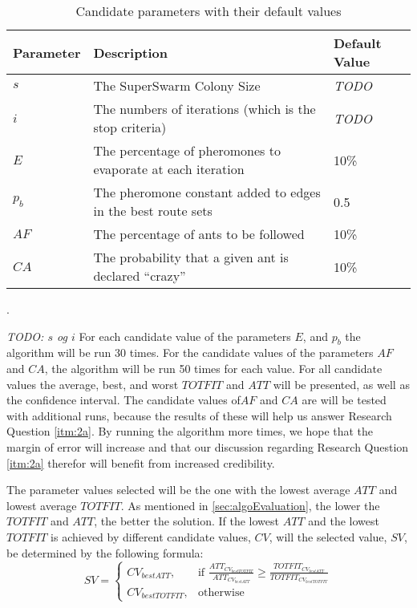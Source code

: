 \begin{table}[H]
	\small
	\begin{tabular}{|l|l|l|}
    	\hline
    	Parameter & Description & Default Value\\
    	\hline
    	$s$ & The SuperSwarm Colony Size & \emph{\color{blue}TODO}\\
    	$i$ & The numbers of iterations (which is the stop criteria) & \emph{\color{blue}TODO}\\
    	$E$ & The percentage of pheromones to evaporate at each iteration & 10\%\\
    	$p_b$ & The pheromone constant added to edges in the best route sets & 0.5\\
    	$AF$ & The percentage of ants to be followed & 10\%\\
    	$CA$ & The probability that a given ant is declared ``crazy'' & 10\%\\
   	    \hline
    \end{tabular}
    \caption {Candidate parameters with their default values}.
    \label{table:parameters}
\end{table}

\emph{\color{blue}TODO: $s$ og $i$}
For each candidate value of the parameters $E$, and $p_b$ the algorithm will be run 30 times. For the candidate values of the parameters $AF$ and $CA$, the algorithm will be run 50 times for each value. For all candidate values the average, best, and worst $TOTFIT$ and $ATT$ will be presented, as well as the confidence interval. The candidate values of$AF$ and $CA$ are will be tested with additional runs, because the results of these will help us answer Research Question \vref{itm:2a}. By running the algorithm more times, we hope that the margin of error will increase and that our discussion regarding Research Question \vref{itm:2a} therefor will benefit from increased credibility.

The parameter values selected will be the one with the lowest average $ATT$ and lowest average $TOTFIT$. As mentioned in \vref{sec:algoEvaluation}, the lower the $TOTFIT$ and $ATT$, the better the solution. If the lowest $ATT$ and the lowest$TOTFIT$ is achieved by different candidate values, $CV$, will the selected value, $SV$, be determined by the following formula:
\[
    SV= 
\begin{cases}
    CV_{bestATT},& \text{if } \frac{ATT_{CV_{bestTOTFIT}}}{ATT_{CV_{bestATT}}}\geq \frac{TOTFIT_{CV_{bestATT}}}{TOTFIT_{CV_{bestTOTFIT}}}\\
    CV_{bestTOTFIT},& \text{otherwise}
\end{cases}
\]


